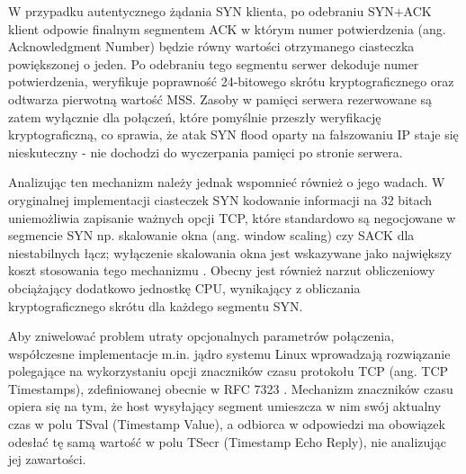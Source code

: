 \documentclass[a4paper,12pt]{article}
\begin{document}
W przypadku autentycznego żądania SYN klienta, po odebraniu SYN$+$ACK klient odpowie finalnym segmentem ACK w którym numer potwierdzenia (ang. Acknowledgment Number) będzie równy wartości otrzymanego ciasteczka powiększonej o jeden. Po odebraniu tego segmentu serwer dekoduje numer potwierdzenia, weryfikuje poprawność 24-bitowego skrótu kryptograficznego oraz odtwarza pierwotną wartość MSS. Zasoby w pamięci serwera rezerwowane są zatem wyłącznie dla połączeń, które pomyślnie przeszły weryfikację kryptograficzną, co sprawia, że atak SYN flood oparty na fałszowaniu IP staje się nieskuteczny - nie dochodzi do wyczerpania pamięci po stronie serwera.

Analizując ten mechanizm należy jednak wspomnieć również o jego wadach. W oryginalnej implementacji ciasteczek SYN kodowanie informacji na 32 bitach uniemożliwia zapisanie ważnych opcji TCP, które standardowo są negocjowane w segmencie SYN np. skalowanie okna (ang. window scaling) czy SACK dla niestabilnych łącz; wyłączenie skalowania okna jest wskazywane jako największy koszt stosowania tego mechanizmu \cite{rfc4987}. Obecny jest również narzut obliczeniowy obciążający dodatkowo jednostkę CPU, wynikający z obliczania kryptograficznego skrótu dla każdego segmentu SYN.

Aby zniwelować problem utraty opcjonalnych parametrów połączenia, współczesne implementacje m.in. jądro systemu Linux wprowadzają rozwiązanie polegające na wykorzystaniu opcji znaczników czasu protokołu TCP (ang. TCP Timestamps), zdefiniowanej obecnie w RFC 7323 \cite{rfc7323}. Mechanizm znaczników czasu opiera się na tym, że host wysyłający segment umieszcza w nim swój aktualny czas w polu TSval (Timestamp Value), a odbiorca w odpowiedzi ma obowiązek odesłać tę samą wartość w polu TSecr (Timestamp Echo Reply), nie analizując jej zawartości.
\end{document}
